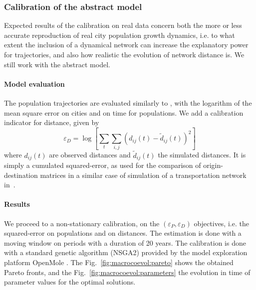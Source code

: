 \subsubsection{Calibration of the abstract model}


Expected results of the calibration on real data concern both the more or less accurate reproduction of real city population growth dynamics, i.e. to what extent the inclusion of a dynamical network can increase the explanatory power for trajectories, and also how realistic the evolution of network distance is. We still work with the abstract model.


\paragraph{Model evaluation}


The population trajectories are evaluated similarly to \cite{raimbault2018indirect}, with the logarithm of the mean square error on cities and on time for populations. We add a calibration indicator for distance, given by
\[
\varepsilon_D = \log \left[ \sum_t \sum_{i,j} \left(d_{ij}(t) - \tilde{d}_{ij}(t)\right)^2\right]
\]
where $d_{ij}(t)$ are observed distances and $\tilde{d}_{ij}(t)$ the simulated distances. It is simply a cumulated squared-error, as used for the comparison of origin-destination matrices in a similar case of simulation of a transportation network in~\cite{jacobs2016transport}.



\paragraph{Results}

We proceed to a non-stationary calibration, on the $(\varepsilon_P,\varepsilon_D)$ objectives, i.e. the squared-error on populations and on distances. The estimation is done with a moving window on periods with a duration of 20 years. The calibration is done with a standard genetic algorithm (NSGA2) provided by the model exploration platform OpenMole \citep{reuillon2013openmole}. The Fig.~\ref{fig:macrocoevol:pareto} shows the obtained Pareto fronts, and the Fig.~\ref{fig:macrocoevol:parameters} the evolution in time of parameter values for the optimal solutions.

